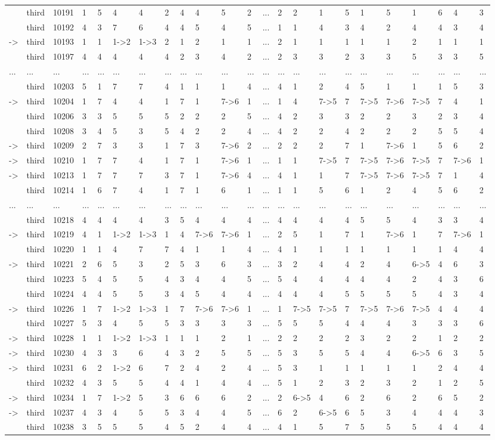 \documentclass[6pt]{article}
\begin{document}
\begin{landscape}
{\begin{longtable}{lllllllllllllllllllllll}
&third&10191&1&5&4&4&2&4&4&5&2&...&2&2&1&5&1&5&1&6&4&3\tabularnewline
&third&10192&4&3&7&6&4&4&5&4&5&...&1&1&4&3&4&2&4&4&3&4\tabularnewline
-\textgreater &third&10193&1&1&1-\textgreater 2&1-\textgreater 3&2&1&2&1&1&...&2&1&1&1&1&1&2&1&1&1\tabularnewline
&third&10197&4&4&4&4&4&2&3&4&2&...&2&3&3&2&3&3&5&3&3&5\tabularnewline
...&...&...&...&...&...&...&...&...&...&...&...&...&...&...&...&...&...&...&...&...&...&...\tabularnewline
&third&10203&5&1&7&7&4&1&1&1&4&...&4&1&2&4&5&1&1&1&5&3\tabularnewline
-\textgreater &third&10204&1&7&4&4&1&7&1&7-\textgreater 6&1&...&1&4&7-\textgreater 5&7&7-\textgreater 5&7-\textgreater 6&7-\textgreater 5&7&4&1\tabularnewline
&third&10206&3&3&5&5&5&2&2&2&5&...&4&2&3&3&2&2&3&2&3&4\tabularnewline
&third&10208&3&4&5&3&5&4&2&2&4&...&4&2&2&4&2&2&2&5&5&4\tabularnewline
-\textgreater &third&10209&2&7&3&3&1&7&3&7-\textgreater 6&2&...&2&2&2&7&1&7-\textgreater 6&1&5&6&2\tabularnewline
-\textgreater &third&10210&1&7&7&4&1&7&1&7-\textgreater 6&1&...&1&1&7-\textgreater 5&7&7-\textgreater 5&7-\textgreater 6&7-\textgreater 5&7&7-\textgreater 6&1\tabularnewline
-\textgreater &third&10213&1&7&7&7&3&7&1&7-\textgreater 6&4&...&4&1&1&7&7-\textgreater 5&7-\textgreater 6&7-\textgreater 5&7&1&4\tabularnewline
&third&10214&1&6&7&4&1&7&1&6&1&...&1&1&5&6&1&2&4&5&6&2\tabularnewline
...&...&...&...&...&...&...&...&...&...&...&...&...&...&...&...&...&...&...&...&...&...&...\tabularnewline
&third&10218&4&4&4&4&3&5&4&4&4&...&4&4&4&4&5&5&4&3&3&4\tabularnewline
-\textgreater &third&10219&4&1&1-\textgreater 2&1-\textgreater 3&1&4&7-\textgreater 6&7-\textgreater 6&1&...&2&5&1&7&1&7-\textgreater 6&1&7&7-\textgreater 6&1\tabularnewline
&third&10220&1&1&4&7&7&4&1&1&4&...&4&1&1&1&1&1&1&1&4&4\tabularnewline
\newpage
-\textgreater &third&10221&2&6&5&3&2&5&3&6&3&...&3&2&4&4&2&4&6-\textgreater 5&4&6&3\tabularnewline
&third&10223&5&4&5&5&4&3&4&4&5&...&5&4&4&4&4&4&2&4&3&6\tabularnewline
&third&10224&4&4&5&5&3&4&5&4&4&...&4&4&4&5&5&5&5&4&3&4\tabularnewline
-\textgreater &third&10226&1&7&1-\textgreater 2&1-\textgreater 3&1&7&7-\textgreater 6&7-\textgreater 6&1&...&1&7-\textgreater 5&7-\textgreater 5&7&7-\textgreater 5&7-\textgreater 6&7-\textgreater 5&4&4&4\tabularnewline
&third&10227&5&3&4&5&5&3&3&3&3&...&5&5&5&4&4&4&3&3&3&6\tabularnewline
-\textgreater &third&10228&1&1&1-\textgreater 2&1-\textgreater 3&1&1&1&2&1&...&2&2&2&2&3&2&2&1&2&2\tabularnewline
-\textgreater &third&10230&4&3&3&6&4&3&2&5&5&...&5&3&5&5&4&4&6-\textgreater 5&6&3&5\tabularnewline
-\textgreater &third&10231&6&2&1-\textgreater 2&6&7&2&4&2&4&...&5&3&1&1&1&1&1&2&4&4\tabularnewline
&third&10232&4&3&5&5&4&4&1&4&4&...&5&1&2&3&2&3&2&1&2&5\tabularnewline
-\textgreater &third&10234&1&7&1-\textgreater 2&5&3&6&6&6&2&...&2&6-\textgreater 5&4&6&2&6&2&6&5&2\tabularnewline
-\textgreater &third&10237&4&3&4&5&5&3&4&4&5&...&6&2&6-\textgreater 5&6&5&3&4&4&4&3\tabularnewline
&third&10238&3&5&5&5&4&5&2&4&4&...&4&1&5&7&5&5&5&4&4&4\tabularnewline
\hline
\end{longtable}}\end{landscape}
\end{document}
